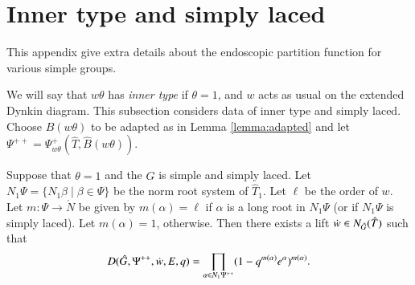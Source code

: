 


\section{Inner type and simply laced}  

This appendix give extra details about the endoscopic partition function
for various simple groups.

We will say that $w\theta$ has {\it inner type} if $\theta=1$, and $w$
acts as usual on the extended Dynkin diagram.  This subsection
considers data of inner type and simply laced.  Choose $\hat
B(w\theta)$ to be adapted as in Lemma \ref{lemma:adapted} and let
$\Psi^{++} = \Psi_{w\theta}^+(\hat T,\hat B(w\theta))$.

\begin{proposition}\label{lemma:inner} 
  Suppose that $\theta=1$ and the $\hat G$ is simple and simply laced.
  Let $N_1\Psi=\{N_1\beta\mid \beta\in \Psi\}$ be the norm root system
  of $\hat T_1$. Let $\ell$ be the order of $w$.  Let $m:\Psi\to
  \ring{N}$ be given by $m(\alpha)=\ell$ if $\alpha$ is a long root in
  $N_1\Psi$ (or if $N_1\Psi$ is simply laced).  Let $m(\alpha) = 1$,
  otherwise.  Then there exists a lift $\dot w\in N_{\hat G}(\hat T)$
  such that
\begin{equation}\label{eqn:laced}
D(\hat G,\Psi^{++},\dot w,E,q) 
= \prod_{\alpha\in N_1\Psi^{++}} (1- q^{m(\alpha)} e^\alpha)^{m(\alpha)}.
\end{equation}
\end{proposition}

